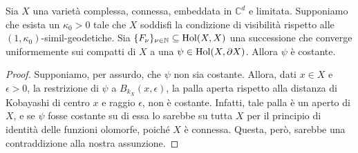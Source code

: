 \begin{thm} \label{lim_is_const}
    Sia $X$ una varietà complessa, connessa, embeddata in $\mathbb{C}^d$ e limitata. Supponiamo che esista un $\kappa_0>0$ tale che $X$ soddisfi la condizione di visibilità rispetto alle $(1,\kappa_0)$-simil-geodetiche. Sia $\{F_\nu\}_{\nu\in\mathbb{N}} \subseteq \textnormal{Hol}(X,X)$  una successione che converge uniformemente sui compatti di $X$ a una $\psi\in\textnormal{Hol}(X,\partial X)$. Allora $\psi$ è costante.
\end{thm}

\begin{proof}
    Supponiamo, per assurdo, che $\psi$ non sia costante. Allora, dati $x \in X$ e $\epsilon>0$, la restrizione di $\psi$ a $B_{k_X}(x,\epsilon)$, la palla aperta rispetto alla distanza di Kobayashi di centro $x$ e raggio $\epsilon$, non è costante. Infatti, tale palla è un aperto di $X$, e se $\psi$ fosse costante su di essa lo sarebbe su tutta $X$ per il principio di identità delle funzioni olomorfe, poiché $X$ è connessa. Questa, però, sarebbe una contraddizione alla nostra assunzione.


\end{proof}
